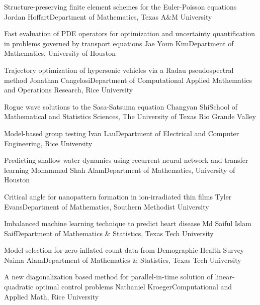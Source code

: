 \begin{postersPG}
\item\poster %
{Structure-preserving finite element schemes for the Euler-Poisson equations}
{Jordan Hoffart}{Department of Mathematics, Texas A\&M University}

\item\poster %
{Fast evaluation of PDE operators for optimization and uncertainty quantification in problems governed by transport equations}
{Jae Youn Kim}{Department of Mathematics, University of Houston}

\item\poster %
{Trajectory optimization of hypersonic vehicles via a Radau pseudospectral method}
{Jonathan Cangelosi}{Department of Computational Applied Mathematics and Operations Research, Rice University}

\item\poster %
{Rogue wave solutions to the Sasa-Satsuma equation}
{Changyan Shi}{School of Mathematical and Statistics Sciences, The University of Texas Rio Grande Valley}

\item\poster %
{Model-based group testing}
{Ivan Lau}{Department of Electrical and Computer Engineering, Rice University}

\item\poster %
{Predicting shallow water dynamics using recurrent neural network and transfer learning}
{Mohammad Shah Alam}{Department of Mathematics, University of Houston}

\item\poster %
{Critical angle for nanopattern formation in ion-irradiated thin films}
{Tyler Evans}{Department of Mathematics, Southern Methodist University}

\item\poster %
{Imbalanced machine learning technique to predict heart disease}
{Md Saiful Islam Saif}{Department of Mathematics \& Statistics, Texas Tech University}

\item\poster %
{Model selection for zero inflated count data from Demographic Health Survey}
{Naima Alam}{Department of Mathematics \& Statistics, Texas Tech University}

\item\poster %
{A new diagonalization based method for parallel-in-time solution of linear-quadratic optimal control problems}
{Nathaniel Kroeger}{Computational and Applied Math, Rice University}


\end{postersPG}

